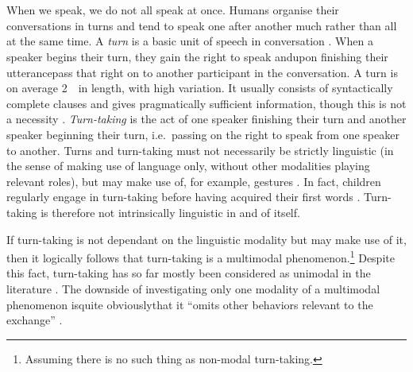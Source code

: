 
\chapter{\introduction}
\label{ch:intro}
When we speak, we do not all speak at once.
Humans organise their conversations in turns and tend to speak one after another much rather than all at the same time.
A \emph{turn} is a basic unit of speech in conversation \citep{sacks_simplest_1978}.
When a speaker begins their turn, they gain the right to speak and\dash upon finishing their utterance\dash pass that right on to another participant in the conversation.
A turn is on average 2~\s\ in length, with high variation.
It usually consists of syntactically complete clauses and gives pragmatically sufficient information, though this is not a necessity \citep[]{levinson_turn-taking_2016}.
\emph{Turn-taking} is the act of one speaker finishing their turn and another speaker beginning their turn, i.e.\ passing on the right to speak from one speaker to another.
Turns and turn-taking must not necessarily be strictly linguistic (in the sense of making use of language only, without other modalities playing relevant roles), but may make use of, for example, gestures \citep[]{schmitt_zur_2005}.
In fact, children regularly engage in turn-taking before having acquired their first words \citep[]{casillas_turn-taking_2016}.
Turn-taking is therefore not intrinsically linguistic in and of itself.

If turn-taking is not dependant on the linguistic modality but may make use of it, then it logically follows that turn-taking is a multimodal phenomenon.\footnote{%
Assuming there is no such thing as non-modal turn-taking.}
Despite this fact, turn-taking has so far mostly been considered as unimodal in the literature \citep[]{rohlfing_multimodal_underreview}.
The downside of investigating only one modality of a multimodal phenomenon is\dash quite obviously\dash that it ``omits other behaviors relevant to the exchange'' \citep[]{rohlfing_multimodal_underreview}.

